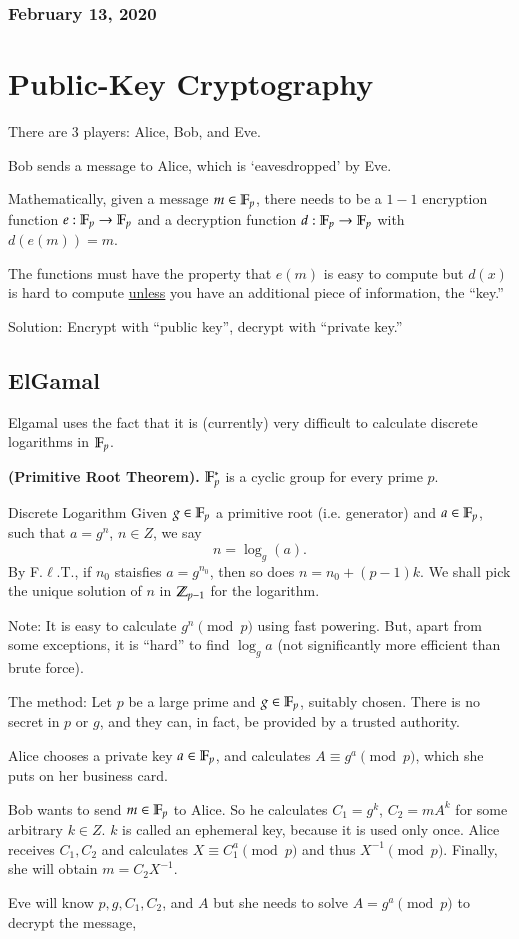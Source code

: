 \subsubsection*{February 13, 2020}
\section{Public-Key Cryptography}
There are 3 players: Alice, Bob, and Eve. 

Bob sends a message to Alice, which is `eavesdropped' by Eve. 

Mathematically, given a message $m\in \mathbb{F}_p$, there needs to be a $1-1$ encryption function $e:\mathbb{F}_p\to \mathbb{F}_p$ and a decryption function $d:\mathbb{F}_p\to \mathbb{F}_p$ with $d(e(m))=m$. 

The functions must have the property that $e(m)$ is easy to compute but $d(x)$ is hard to compute \ul{unless} you have an additional piece of information, the ``key.'' 

Solution: Encrypt with ``public key'', decrypt with ``private key.'' 

\subsection{ElGamal}
Elgamal uses the fact that it is (currently) very difficult to calculate discrete logarithms in $\mathbb{F}_p$. 

\begin{theorem}
	\textbf{(Primitive Root Theorem).} $\mathbb{F}_p^*$ is a cyclic group for every prime $p$. 
\end{theorem}

\begin{defn}{Discrete Logarithm}
	Given $g\in \mathbb{F}_p$ a primitive root (i.e. generator) and $a\in \mathbb{F}_p$, such that $a=g^n$, $n\in Z$, we say
	\begin{equation}
		n=\log_g(a).
	\end{equation}
	By F.$\ell$.T., if $n_0$ staisfies $a=g^{n_0}$, then so does $n=n_0+(p-1)k$. We shall pick the unique solution of $n$ in $\mathbb{Z}_{p-1}$ for the logarithm. 
\end{defn}

Note: It is easy to calculate $g^n\pmod{p}$ using fast powering. But, apart from some exceptions, it is ``hard'' to find $\log_g a$ (not significantly more efficient than brute force). 

The method: Let $p$ be a large prime and $g\in \mathbb{F}_p$, suitably chosen. There is no secret in $p$ or $g$, and they can, in fact, be provided by a trusted authority. 

Alice chooses a private key $a\in \mathbb{F}_p$, and calculates $A\equiv g^a\pmod{p}$, which she puts on her business card. 

Bob wants to send $m\in \mathbb{F}_p$ to Alice. So he calculates $C_1=g^k$, $C_2=mA^k$ for some arbitrary $k\in Z$. $k$ is called an ephemeral key, because it is used only once. Alice receives $C_1, C_2$ and calculates $X\equiv C_1^a\pmod{p}$ and thus $X^{-1}\pmod{p}$. Finally, she will obtain $m = C_2X^{-1}$. 

Eve will know $p, g, C_1, C_2$, and $A$ but she needs to solve $A=g^a\pmod{p}$ to decrypt the message, 